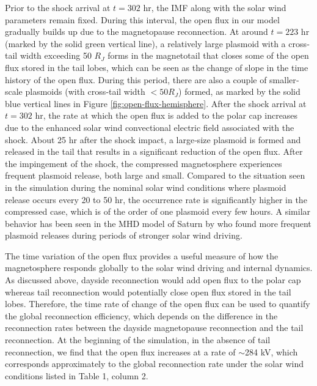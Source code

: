 Prior to the shock arrival at $t = 302$ hr, the IMF along with the solar wind parameters remain fixed. During this interval, the open flux in our model gradually builds up due to the magnetopause reconnection. At around $t = 223$ hr (marked by the solid green vertical line), a relatively large plasmoid with a cross‐tail width exceeding 50 $R_J$ forms in the magnetotail that closes some of the open flux stored in the tail lobes, which can be seen as the change of slope in the time history of the open flux. During this period, there are also a couple of smaller‐scale plasmoids (with cross‐tail width $<50 R_J$) formed, as marked by the solid blue vertical lines in Figure \ref{fig:open-flux-hemisphere}. After the shock arrival at $t = 302$ hr, the rate at which the open flux is added to the polar cap increases due to the enhanced solar wind convectional electric field associated with the shock. About 25 hr after the shock impact, a large‐size plasmoid is formed and released in the tail that results in a significant reduction of the open flux. After the impingement of the shock, the compressed magnetosphere experiences frequent plasmoid release, both large and small. Compared to the situation seen in the simulation during the nominal solar wind conditions where plasmoid release occurs every 20 to 50 hr, the occurrence rate is significantly higher in the compressed case, which is of the order of one plasmoid every few hours. A similar behavior has been seen in the MHD model of Saturn by \cite{Jia2012} who found more frequent plasmoid releases during periods of stronger solar wind driving. 

The time variation of the open flux provides a useful measure of how the magnetosphere responds globally to the solar wind driving and internal dynamics. As discussed above, dayside reconnection would add open flux to the polar cap whereas tail reconnection would potentially close open flux stored in the tail lobes. Therefore, the time rate of change of the open flux can be used to quantify the global reconnection efficiency, which depends on the difference in the reconnection rates between the dayside magnetopause reconnection and the tail reconnection. At the beginning of the simulation, in the absence of tail reconnection, we find that the open flux increases at a rate of $\sim$284 kV, which corresponds approximately to the global reconnection rate under the solar wind conditions listed in Table 1, column 2.

